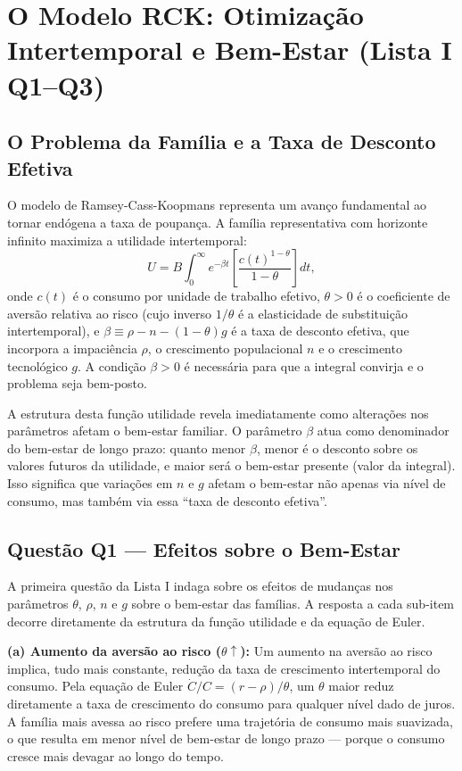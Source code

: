\documentclass[12pt, a4paper]{article}
\begin{document}
\section{O Modelo RCK: Otimização Intertemporal e Bem-Estar (Lista I Q1--Q3)}

\subsection{O Problema da Família e a Taxa de Desconto Efetiva}

O modelo de Ramsey-Cass-Koopmans representa um avanço fundamental ao tornar endógena a taxa de poupança. A família representativa com horizonte infinito maximiza a utilidade intertemporal:
\[
U = B\int_0^\infty e^{-\beta t}\!\left[\frac{c(t)^{1-\theta}}{1-\theta}\right]dt,
\]
onde $c(t)$ é o consumo por unidade de trabalho efetivo, $\theta > 0$ é o coeficiente de aversão relativa ao risco (cujo inverso $1/\theta$ é a elasticidade de substituição intertemporal), e $\beta \equiv \rho - n - (1-\theta)g$ é a taxa de desconto efetiva, que incorpora a impaciência $\rho$, o crescimento populacional $n$ e o crescimento tecnológico $g$. A condição $\beta > 0$ é necessária para que a integral convirja e o problema seja bem-posto.

A estrutura desta função utilidade revela imediatamente como alterações nos parâmetros afetam o bem-estar familiar. O parâmetro $\beta$ atua como denominador do bem-estar de longo prazo: quanto menor $\beta$, menor é o desconto sobre os valores futuros da utilidade, e maior será o bem-estar presente (valor da integral). Isso significa que variações em $n$ e $g$ afetam o bem-estar não apenas via nível de consumo, mas também via essa ``taxa de desconto efetiva''.

\subsection{Questão Q1 --- Efeitos sobre o Bem-Estar}

A primeira questão da Lista I indaga sobre os efeitos de mudanças nos parâmetros $\theta$, $\rho$, $n$ e $g$ sobre o bem-estar das famílias. A resposta a cada sub-item decorre diretamente da estrutura da função utilidade e da equação de Euler.

\textbf{(a) Aumento da aversão ao risco ($\theta\uparrow$):} Um aumento na aversão ao risco implica, tudo mais constante, redução da taxa de crescimento intertemporal do consumo. Pela equação de Euler $\dot{C}/C = (r-\rho)/\theta$, um $\theta$ maior reduz diretamente a taxa de crescimento do consumo para qualquer nível dado de juros. A família mais avessa ao risco prefere uma trajetória de consumo mais suavizada, o que resulta em menor nível de bem-estar de longo prazo — porque o consumo cresce mais devagar ao longo do tempo.
\end{document}
